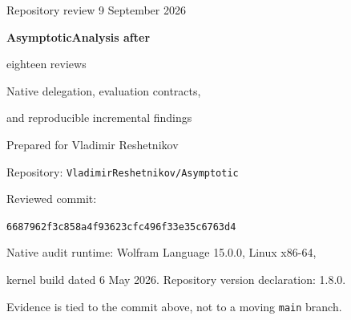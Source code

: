 \documentclass[11pt]{article}
\newcommand{\code}[1]{\texttt{#1}}
\newcommand{\pin}{6687962f3c858a4f93623cfc496f33e35c6763d4}
\begin{document}
\begin{titlepage}
\vspace*{0.25in}
{\large Repository review \hfill 9 September 2026}\par
\vspace{0.45in}
{\LARGE\bfseries AsymptoticAnalysis after\par eighteen reviews}\par
\vspace{0.22in}
{\Large Native delegation, evaluation contracts,\par and reproducible incremental findings}\par
\vspace{0.4in}
Prepared for Vladimir Reshetnikov\par
Repository: \code{VladimirReshetnikov/Asymptotic}\par
Reviewed commit:\par
\code{\pin}\par
\vspace{0.35in}
\begin{abstract}
The repository has developed beyond a specialized inverse-expansion package: it now combines real generalized asymptotic objects with a native Wolfram Language delegation layer. The strongest new findings in the inspected snapshot concern that boundary, not a newly disproved coefficient formula. Public native-kernel probes reproduce three distinct defects: configured backend defaults are ignored; a legal expansion variable named \code{Method} is misclassified when reconstructing native metadata; and a fully applied identity function changes automatic dispatch, causing otherwise supported requests to fail. Separate native evaluations of three narrow candidate patch groups repair the demonstrated behaviors while preserving selected controls.

A fourth contribution measures the storage amplification caused by eagerly retaining both a native series and its normalized expression. A fifth identifies a current README contradiction about automatic routing. The report compares the package with \code{Series}, \code{SeriesData}, \code{InverseSeries}, \code{ComposeSeries}, \code{Asymptotic}, and \code{AsymptoticSolve}, and independently verifies a representative irrational-exponent inverse in exact arithmetic. Previously catalogued defects and broad extension wish lists are not reissued as new findings. The accompanying archive contains reproducible Wolfram probes, fifteen desired-contract tests, a fail-closed candidate generator, exact Python oracles, and an evidence ledger. The combined patch and complete upstream test suite have not been validated here.
\end{abstract}
\vfill
\small Native audit runtime: Wolfram Language 15.0.0, Linux x86-64,\par
kernel build dated 6 May 2026. Repository version declaration: 1.8.0.\par
Evidence is tied to the commit above, not to a moving \code{main} branch.
\end{titlepage}
\tableofcontents
\newpage
\end{document}
